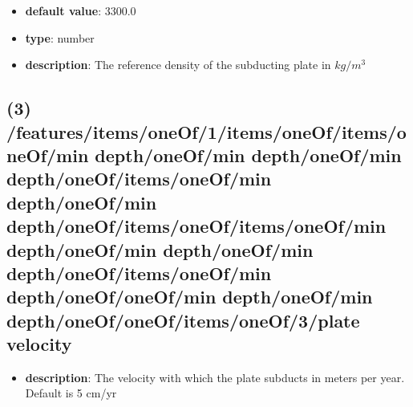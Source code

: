 \begin{itemize}[leftmargin=3em]\item {\bf default value}: 3300.0
\item {\bf type}: number
\item {\bf description}: The reference density of the subducting plate in $kg/m^3$
\end{itemize}\subsection{(3) /features/items/oneOf/1/items/oneOf/items/oneOf/min depth/oneOf/min depth/oneOf/min depth/oneOf/items/oneOf/min depth/oneOf/min depth/oneOf/items/oneOf/items/oneOf/min depth/oneOf/min depth/oneOf/min depth/oneOf/items/oneOf/min depth/oneOf/oneOf/min depth/oneOf/min depth/oneOf/oneOf/items/oneOf/3/plate velocity}
\begin{itemize}[leftmargin=3em]\item {\bf description}: The velocity with which the plate subducts in meters per year. Default is 5 cm/yr
\end{itemize}
